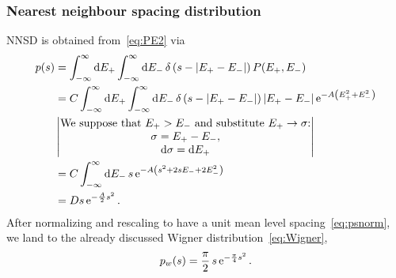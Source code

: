 \documentclass[a4paper,11pt,twoside]{article}
\begin{document}
        \subsubsection{Nearest neighbour spacing distribution}
            NNSD is obtained from~\eqref{eq:PE2} via
            \begin{align}
                p(s)&=\int_{-\infty}^{\infty}\mathrm{d} E_{+}\int_{-\infty}^{\infty}\mathrm{d} E_{-}\,\delta\left(s-\left|{E_{+}-E_{-}}\right|\right)P(E_{+},E_{-})\nonumber\\
                    &=C\int_{-\infty}^{\infty}\mathrm{d} E_{+}\int_{-\infty}^{\infty}\mathrm{d} E_{-}\,\delta\left(s-\left|{E_{+}-E_{-}}\right|\right)\left|{E_{+}-E_{-}}\right|\operatorname{e}^{-A\left(E_{+}^{2}+E_{-}^{2}\right)}\nonumber\\
                    &\begin{vmatrix}\text{We suppose that $E_{+}>E_{-}$ and substitute $E_{+}\rightarrow\sigma$:} \\
                        \sigma=E_{+}-E_{-},\\
                        \mathrm{d}\sigma=\mathrm{d} E_{+}\end{vmatrix}\nonumber\\
                    &=C\int_{-\infty}^{\infty}\mathrm{d} E_{-}\,s\operatorname{e}^{-A\left(s^{2}+2sE_{-}+2E_{-}^{2}\right)}\nonumber\\
                    &=Ds\operatorname{e}^{-\frac{A}{2}s^{2}}.
            \end{align} 
            After normalizing and rescaling to have a unit mean level spacing~\eqref{eq:psnorm}, we land to the already discussed Wigner distribution~\eqref{eq:Wigner},
            \begin{equation}\label{eq:Wigner1}
                p_{w}(s)=\frac{\pi}{2}\,s\operatorname{e}^{-\frac{\pi}{4}s^{2}}.
            \end{equation}
\end{document}
